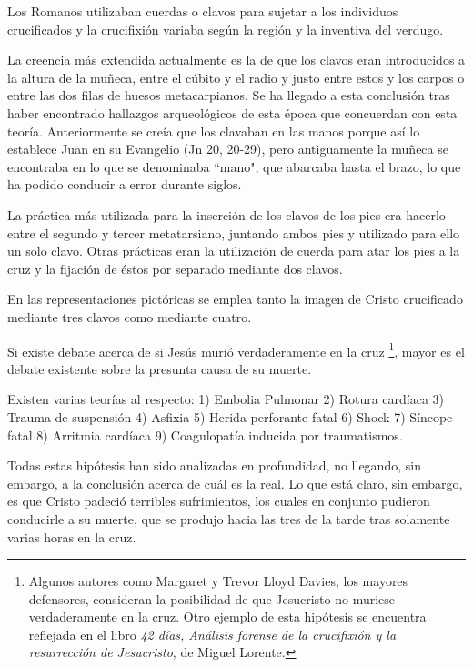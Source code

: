 Los Romanos utilizaban cuerdas o clavos para sujetar a los individuos crucificados y la crucifixión variaba según la región y la inventiva del verdugo.

La creencia más extendida actualmente es la de que los clavos eran introducidos a la altura de la muñeca, entre el cúbito y el radio y justo entre estos y los carpos o entre las dos filas de huesos metacarpianos. Se ha llegado a esta conclusión tras haber encontrado hallazgos arqueológicos de esta época que concuerdan con esta teoría. Anteriormente se creía que los clavaban en las manos porque así lo establece Juan en su Evangelio (Jn 20, 20-29), pero antiguamente la muñeca se encontraba en lo que se denominaba ``mano", que abarcaba hasta el brazo, lo que ha podido conducir a error durante siglos.

La práctica más utilizada para la inserción de los clavos de los pies era hacerlo entre el segundo y tercer metatarsiano, juntando ambos pies y utilizado para ello un solo clavo. Otras prácticas eran la utilización de cuerda para atar los pies a la cruz y la fijación de éstos por separado mediante dos clavos.

En las representaciones pictóricas se emplea tanto la imagen de Cristo crucificado mediante tres clavos como mediante cuatro.


Si existe debate acerca de si Jesús murió verdaderamente en la cruz \footnote{Algunos autores como Margaret y Trevor Lloyd Davies, los mayores defensores, consideran la posibilidad de que Jesucristo no muriese verdaderamente en la cruz. Otro ejemplo de esta hipótesis se encuentra reflejada en el libro \textit{42 días, Análisis forense de la crucifixión y la resurrección de Jesucristo}, de Miguel Lorente.}, mayor es el debate existente sobre la presunta causa de su muerte.

Existen varias teorías al respecto: 1) Embolia Pulmonar 2) Rotura cardíaca 3) Trauma de suspensión 4) Asfixia 5) Herida perforante fatal 6) Shock 7) Síncope fatal 8) Arritmia cardíaca 9) Coagulopatía inducida por traumatismos.

Todas estas hipótesis han sido analizadas en profundidad, no llegando, sin embargo, a la conclusión acerca de cuál es la real. Lo que está claro, sin embargo, es que Cristo padeció terribles sufrimientos, los cuales en conjunto pudieron conducirle a su muerte, que se produjo hacia las tres de la tarde tras solamente varias horas en la cruz.

